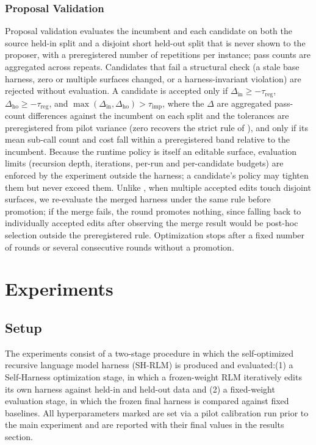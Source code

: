 \documentclass{article}
\begin{document}
\subsubsection{Proposal Validation}
\label{sec:proposal-validation}

Proposal validation evaluates the incumbent and each candidate on both the source held-in split and a disjoint short held-out split that is never shown to the proposer, with a preregistered number of repetitions per instance; pass counts are aggregated across repeats. Candidates that fail a structural check (a stale base harness, zero or multiple surfaces changed, or a harness-invariant violation) are rejected without evaluation. A candidate is accepted only if $\Delta_{\mathrm{in}} \ge -\tau_{\mathrm{reg}}$, $\Delta_{\mathrm{ho}} \ge -\tau_{\mathrm{reg}}$, and $\max(\Delta_{\mathrm{in}}, \Delta_{\mathrm{ho}}) > \tau_{\mathrm{imp}}$, where the $\Delta$ are aggregated pass-count differences against the incumbent on each split and the tolerances are preregistered from pilot variance (zero recovers the strict rule of \citet{zhang2026selfharness}), and only if its mean sub-call count and cost fall within a preregistered band relative to the incumbent. Because the runtime policy is itself an editable surface, evaluation limits (recursion depth, iterations, per-run and per-candidate budgets) are enforced by the experiment outside the harness; a candidate's policy may tighten them but never exceed them. Unlike \citet{zhang2026selfharness}, when multiple accepted edits touch disjoint surfaces, we re-evaluate the merged harness under the same rule before promotion; if the merge fails, the round promotes nothing, since falling back to individually accepted edits after observing the merge result would be post-hoc selection outside the preregistered rule. Optimization stops after a fixed number of rounds or several consecutive rounds without a promotion.

\section{Experiments}
\subsection{Setup}
The experiments consist of a two-stage procedure in which the self-optimized recursive language model harness (SH-RLM) is produced and evaluated:(1) a Self-Harness optimization stage, in which a frozen-weight RLM iteratively edits its own harness against held-in and held-out data and (2) a fixed-weight evaluation stage, in which the frozen final harness is compared against fixed baselines. All hyperparameters marked are set via a pilot calibration run  prior to the main experiment and are reported with their final values in the results section.
\newline
\end{document}
